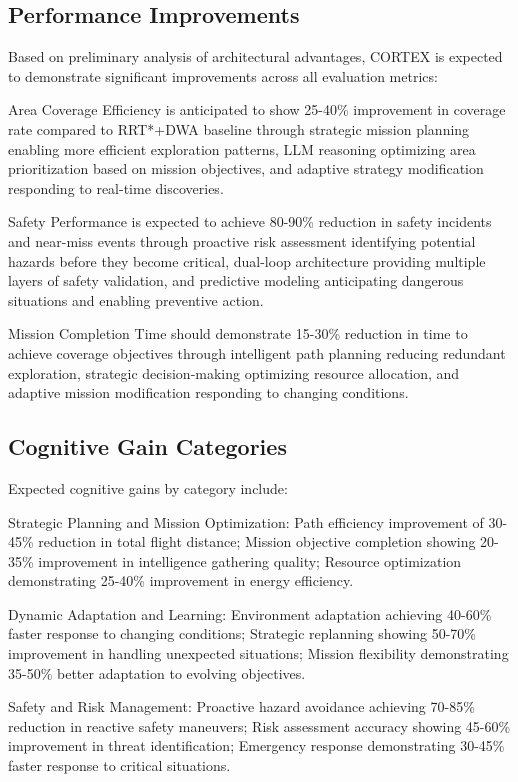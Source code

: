 \subsection{Performance Improvements}

Based on preliminary analysis of architectural advantages, CORTEX is expected to demonstrate significant improvements across all evaluation metrics:

Area Coverage Efficiency is anticipated to show 25-40\% improvement in coverage rate compared to RRT*+DWA baseline through strategic mission planning enabling more efficient exploration patterns, LLM reasoning optimizing area prioritization based on mission objectives, and adaptive strategy modification responding to real-time discoveries.

Safety Performance is expected to achieve 80-90\% reduction in safety incidents and near-miss events through proactive risk assessment identifying potential hazards before they become critical, dual-loop architecture providing multiple layers of safety validation, and predictive modeling anticipating dangerous situations and enabling preventive action.

Mission Completion Time should demonstrate 15-30\% reduction in time to achieve coverage objectives through intelligent path planning reducing redundant exploration, strategic decision-making optimizing resource allocation, and adaptive mission modification responding to changing conditions.

\subsection{Cognitive Gain Categories}

Expected cognitive gains by category include:

Strategic Planning and Mission Optimization: Path efficiency improvement of 30-45\% reduction in total flight distance; Mission objective completion showing 20-35\% improvement in intelligence gathering quality; Resource optimization demonstrating 25-40\% improvement in energy efficiency.

Dynamic Adaptation and Learning: Environment adaptation achieving 40-60\% faster response to changing conditions; Strategic replanning showing 50-70\% improvement in handling unexpected situations; Mission flexibility demonstrating 35-50\% better adaptation to evolving objectives.

Safety and Risk Management: Proactive hazard avoidance achieving 70-85\% reduction in reactive safety maneuvers; Risk assessment accuracy showing 45-60\% improvement in threat identification; Emergency response demonstrating 30-45\% faster response to critical situations.

